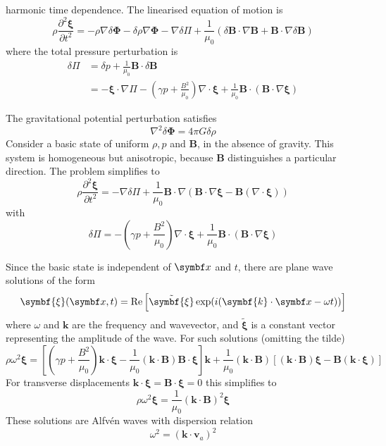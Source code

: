 \documentclass{jknotes}
\newcommand{\B}{\symbf{B}}
\newcommand{\flux}{\symbf{\Phi}}
\newcommand{\disp}{\symbf{\xi}}
\begin{document}
harmonic time dependence. The linearised equation of motion is
\begin{equation}
	\rho \frac{\partial^2 \disp}{\partial t^2} = -\rho \nabla \delta \flux -
	\delta \rho \nabla \flux - \nabla \delta \Pi + \frac{1}{\mu_0}(\delta \B
	\cdot \nabla \B + \B \cdot \nabla \delta \B)
\end{equation}
where the total pressure perturbation is
\begin{align}
	\delta \Pi &= \delta p + \frac{1}{\mu_0}\B \cdot \delta \B \\
			   &= -\disp \cdot \nabla \Pi - \left(\gamma p +
			   \frac{B^2}{\mu_0}\right)\nabla \cdot \disp + \frac{1}{\mu_0} \B \cdot
			   (\B \cdot \nabla \disp)
\end{align}

The gravitational potential perturbation satisfies
\begin{equation}
	\nabla^2 \delta \flux = 4\pi G \delta \rho
\end{equation}
Consider a basic state of uniform $\rho, p$ and $\B$, in the absence of
gravity. This system is homogeneous but anisotropic, because $\B$
distinguishes a particular direction. The problem simplifies to
\begin{equation}
	\rho \frac{\partial^2 \disp}{\partial t^2} = -\nabla \delta \Pi +
	\frac{1}{\mu_0} \B \cdot \nabla (\B \cdot \nabla \disp - \B (\nabla \cdot
	\disp))
\end{equation}
with 
\begin{equation}
	\delta \Pi = -\left(\gamma p + \frac{B^2}{\mu_0}\right)\nabla \cdot \disp +
	\frac{1}{\mu_0}\B \cdot (\B \cdot \nabla \disp)
\end{equation}

Since the basic state is independent of $\x$ and $t$, there are plane wave
solutions of the form
\begin{equation}
	\disp(\x,t) = \Re \left[ \tilde{\disp}\exp(i(\symbf{k}\cdot\x - \omega t))
	\right]
\end{equation}
where $\omega$ and $\symbf{k}$ are the frequency and wavevector, and
$\tilde{\disp}$ is a constant vector representing the amplitude of the wave.
For such solutions (omitting the tilde)
\begin{equation}
	\rho \omega^2 \disp = \left[ \left(\gamma p +
	\frac{B^2}{\mu_0}\right)\symbf{k}\cdot\disp -
	\frac{1}{\mu_0}(\symbf{k}\cdot\B)\B\cdot\disp\right]\symbf{k} +
	\frac{1}{\mu_0}(\symbf{k}\cdot\B)\left[(\symbf{k}\cdot\B)\disp -
	\B(\symbf{k}\cdot\disp)\right]
	\label{eq:5:1}
\end{equation}
For transverse displacements $\symbf{k} \cdot \disp = \B \cdot \disp = 0$
this simplifies to
\begin{equation}
	\rho \omega^2 \disp = \frac{1}{\mu_0}(\symbf{k}\cdot\B)^2\disp
\end{equation}
These solutions are Alfv\'{e}n waves with dispersion relation
\begin{equation}
	\omega^2 = (\symbf{k}\cdot\symbf{v}_a)^2
\end{equation}
\end{document}
